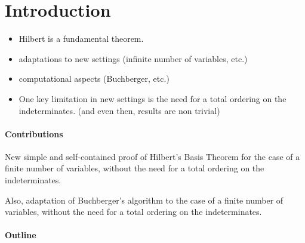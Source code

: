 \section{Introduction}
\label{sec:intro}

\begin{itemize}
    \item Hilbert is a fundamental theorem.
    \item adaptations to new settings (infinite number of
        variables, etc.)
    \item computational aspects (Buchberger, etc.)
    \item One key limitation in new settings is the need
        for a total ordering on the indeterminates.
        (and even then, results are non trivial)
\end{itemize}

\paragraph{Contributions}

New simple and self-contained proof of Hilbert's Basis Theorem
for the case of a finite number of variables, 
without the need for a total ordering on the indeterminates.

Also, adaptation of Buchberger's algorithm to the case of a
finite number of variables, without the need for a total ordering
on the indeterminates.

\paragraph{Outline}
